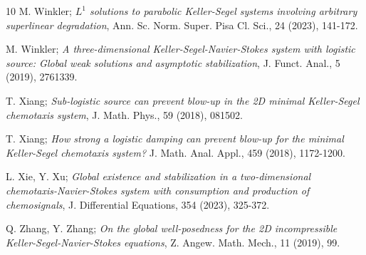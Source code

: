 \documentclass[reqno]{amsart}
\begin{document}
\begin{thebibliography}{10}
 M. Winkler;
\emph{$L^1$ solutions to parabolic Keller-Segel systems involving arbitrary superlinear 
degradation}, Ann. Sc. Norm. Super. Pisa Cl. Sci., 24 (2023), 141-172.

 M. Winkler;
\emph{A three-dimensional Keller-Segel-Navier-Stokes system with logistic source: 
Global weak solutions and asymptotic stabilization}, J. Funct. Anal., 5 (2019), 2761339.

 T. Xiang;
\emph{Sub-logistic source can prevent blow-up in the 2D minimal Keller-Segel 
chemotaxis system}, J. Math. Phys., 59 (2018), 081502.

 T. Xiang;
\emph{How strong a logistic damping can prevent blow-up for the minimal Keller-Segel 
chemotaxis system?} J. Math. Anal. Appl., 459 (2018), 1172-1200.

 L. Xie, Y. Xu;
\emph{Global existence and stabilization in a two-dimensional chemotaxis-Navier-Stokes 
system with consumption and production of chemosignals}, 
J. Differential Equations, 354 (2023), 325-372.

 Q. Zhang, Y. Zhang;
\emph{On the global well-posedness for the 2D incompressible Keller-Segel-Navier-Stokes 
equations}, Z. Angew. Math. Mech., 11 (2019), 99.

\end{thebibliography}
\end{document}
